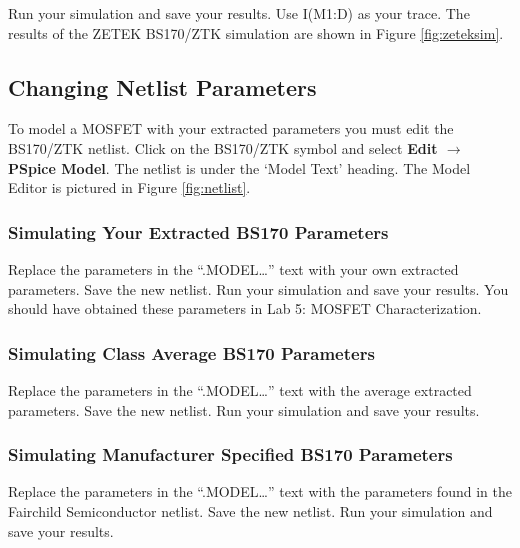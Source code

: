 \documentclass[12pt]{../manual}
\begin{document}
Run your simulation and save your results. Use I(M1:D) as your trace. The results of the ZETEK BS170/ZTK simulation are shown in Figure \ref{fig:zeteksim}.


\subsection{Changing Netlist Parameters}
To model a MOSFET with your extracted parameters you must edit the BS170/ZTK netlist. Click on the BS170/ZTK symbol and select \textbf{Edit $\to$ PSpice Model}. The netlist is under the `Model Text’ heading. The Model Editor is pictured in Figure \ref{fig:netlist}.


\subsubsection{Simulating Your Extracted BS170 Parameters}
Replace the parameters in the ``.MODEL\dots'' text with your own extracted parameters. Save the new netlist. Run your simulation and save your results. You should have obtained these parameters in Lab 5: MOSFET Characterization.

\subsubsection{Simulating Class Average BS170 Parameters}
Replace the parameters in the ``.MODEL\dots'' text with the average extracted parameters. Save the new netlist. Run your simulation and save your results.

\subsubsection{Simulating Manufacturer Specified BS170 Parameters}
Replace the parameters in the ``.MODEL\dots'' text with the parameters found in the Fairchild Semiconductor netlist. Save the new netlist. Run your simulation and save your results.
\end{document}
